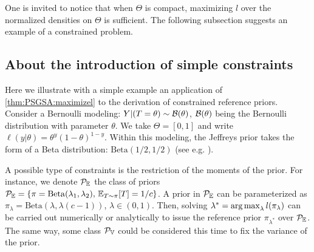 One is invited to notice that when $\Theta$ is compact, maximizing $l$ over the normalized densities on $\Theta$ is sufficient.
The following subsection suggests an example of a constrained problem.



    


\subsection{About the introduction of simple constraints}


Here we illustrate with a simple example an application of \cref{thm:PSGSA:maximizel} to the derivation of constrained reference priors.
Consider a Bernoulli modeling: $Y|(T=\theta)\sim\mathcal{B}(\theta)$, $\mathcal{B}(\theta)$ being the Bernoulli distribution with parameter $\theta$. We take $\Theta=[0,1]$ and write $\ell(y|\theta)=\theta^{y}(1-\theta)^{1-y}$.
%
Within this modeling, the Jeffreys prior takes the form of a Beta distribution: $\mathrm{Beta}(1/2,1/2)$ (see e.g. \cite{robert_bayesian_2007}).


A possible type of constraints is the restriction of the moments of the prior. For instance,
we denote $\mathcal{P}_{\mathbb{E}}$ the class of priors $\mathcal{P}_{\mathbb{E}}=\{\pi=\mathrm{Beta}(\lambda_1,\lambda_2),\,\mathbb{E}_{T\sim\pi}[T]=1/c\}$. A prior in $\mathcal{P}_{\mathbb{E}}$ can be parameterized as $\pi_\lambda = \mathrm{Beta}(\lambda,\lambda(c-1))$, $\lambda\in(0,1)$.
Then, %
solving $\lambda^\ast=\operatorname*{arg\,max}_\lambda l(\pi_\lambda)$ can be carried out numerically or analytically to issue the reference prior $\pi_{\lambda^\ast}$ over $\mathcal{P}_{\mathbb{E}}$.
The same way, some class $\mathcal{P}_{\mathbb{V}}$ could be considered this time to fix the variance of the prior.

